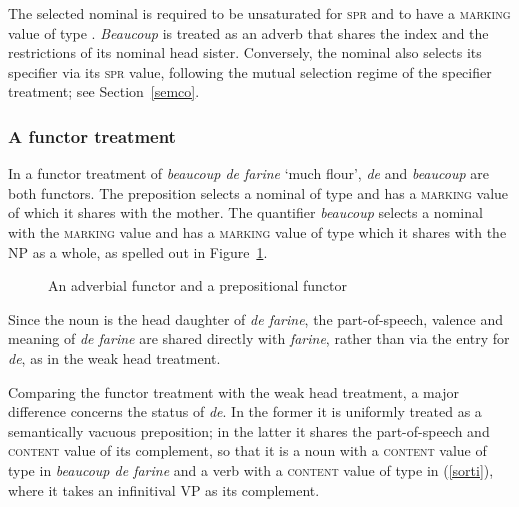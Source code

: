 \documentclass[output=paper,biblatex,babelshorthands,newtxmath,draftmode,colorlinks,citecolor=brown]{langscibook}
\begin{document}
\noindent
The selected nominal is required to be unsaturated for \textsc{spr} and to have a 
\textsc{marking} value of type . \emph{Beaucoup} is treated as an adverb that  
shares the index and the restrictions of its nominal head sister. Conversely, the nominal
also selects its specifier via its \textsc{spr} value, following the mutual 
selection regime of the specifier treatment; see Section~\ref{semco}.


\subsubsection{A functor treatment} 

\largerpage
In a functor treatment of \emph{beaucoup de farine} `much flour', \emph{de} and 
\emph{beaucoup} are both functors. The preposition selects a nominal of type  and 
has a \textsc{marking} value of  which it shares with the mother. 
The quantifier \emph{beaucoup} selects a nominal with the \textsc{marking} value 
 and has a \textsc{marking} value of type  which it 
shares with the NP as a whole, as spelled out in Figure~\ref{beau}.

\begin{figure}
\centering
{}
\caption{\label{beau} An adverbial functor and a prepositional functor}
\end{figure}

Since the noun is the head daughter of \emph{de farine}, the 
part-of-speech, valence and meaning of \emph{de farine} 
are shared directly with \emph{farine}, 
rather than via the entry for \emph{de}, as in the weak head treatment. 

Comparing the functor treatment with the weak head treatment,  
a major difference concerns the status of \emph{de}. In the former it is 
uniformly treated as a semantically vacuous preposition; in the latter it shares 
the part-of-speech and \textsc{content} value of its complement, so that it is 
a noun with a \textsc{content} value of type  in 
\emph{beaucoup de farine} and a verb with a \textsc{content} value of type 
 in (\ref{sorti}), where it takes 
an infinitival VP as its complement.   
\end{document}
